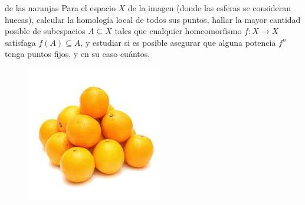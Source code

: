 \documentclass[twoside]{article}
\begin{document}
\begin{ejercicio}{de las naranjas}
Para el espacio $X$ de la imagen (donde las esferas se consideran huecas), calcular la homología local de todos sus puntos, hallar la mayor cantidad posible de subespacios $A\subseteq X$ tales que cualquier homeomorfismo $f:X\to X$ satisfaga $f(A)\subseteq A$, y estudiar si es posible asegurar que alguna potencia $f^n$ tenga puntos fijos, y en su caso cuántos. 

\begin{figure}[h!]
\centering
\includegraphics[scale=0.5]{naranjas}
\end{figure}
\end{ejercicio}
\end{document}
